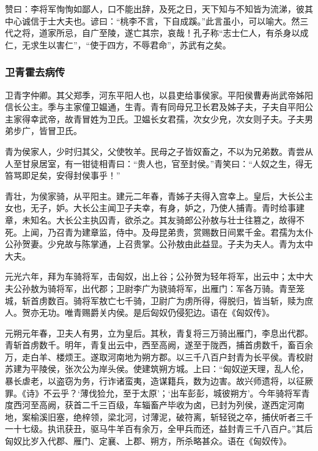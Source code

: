 \documentclass[]{article}
\begin{document}
赞曰：李将军恂恂如鄙人，口不能出辞，及死之日，天下知与不知皆为流涕，彼其中心诚信于士大夫也。谚曰：``桃李不言，下自成蹊。''此言虽小，可以喻大。然三代之将，道家所忌，自广至陵，遂亡其宗，哀哉！孔子称``志士仁人，有杀身以成仁，无求生以害仁''，``使于四方，不辱君命''，苏武有之矣。

\hypertarget{header-n4450}{%
\subsubsection{卫青霍去病传}\label{header-n4450}}

卫青字仲卿。其父郑季，河东平阳人也，以县吏给事侯家。平阳侯曹寿尚武帝姊阳信长公主。季与主家僮卫媪通，生青。青有同母兄卫长君及姊子夫，子夫自平阳公主家得幸武帝，故青冒姓为卫氏。卫媪长女君孺，次女少皃，次女则子夫。子夫男弟步广，皆冒卫氏。

青为侯家人，少时归其父，父使牧羊。民母之子皆奴畜之，不以为兄弟数。青尝从人至甘泉居室，有一钳徒相青曰：``贵人也，官至封侯。''青笑曰：``人奴之生，得无笞骂即足矣，安得封侯事乎！''

青壮，为侯家骑，从平阳主。建元二年春，青姊子夫得入宫幸上。皇后，大长公主女也，无子，妒。大长公主闻卫子夫幸，有身，妒之，乃使人捕青。青时给事建章，未知名。大长公主执囚青，欲杀之。其友骑郎公孙敖与壮士往篡之，故得不死。上闻，乃召青为建章监，侍中。及母昆弟贵，赏赐数日间累千金。君孺为太仆公孙贺妻。少皃故与陈掌通，上召贵掌。公孙敖由此益显。子夫为夫人。青为太中大夫。

元光六年，拜为车骑将军，击匈奴，出上谷；公孙贺为轻年将军，出云中；太中大夫公孙敖为骑将军，出代郡；卫尉李广为骁骑将军，出雁门：军各万骑。青至笼城，斩首虏数百。骑将军敖亡七千骑，卫尉广为虏所得，得脱归，皆当斩，赎为庶人。贺亦无功。唯青赐爵关内侯。是后匈奴仍侵犯边。语在《匈奴传》。

元朔元年春，卫夫人有男，立为皇后。其秋，青复将三万骑出雁门，李息出代郡。青斩首虏数千。明年，青复出云中，西至高阙，遂至于陇西，捕首虏数千，畜百余万，走白羊、楼烦王。遂取河南地为朔方郡。以三千八百户封青为长平侯。青校尉苏建为平陵侯，张次公为岸头侯。使建筑朔方城。上曰：``匈奴逆天理，乱人伦，暴长虐老，以盗窃为务，行诈诸蛮夷，造谋籍兵，数为边害。故兴师遗将，以征厥罪。《诗》不云乎？`薄伐猃允，至于太原'；`出车彭彭，城彼朔方'。今年骑将军青度西河至高阙，获首二千三百级，车辎畜产毕收为卤，已封为列侯，遂西定河南地，案榆溪旧塞，绝梓领，梁北河，讨薄泥，破符离，斩轻锐之卒，捕伏听者三千一十七级。执讯获丑，驱马牛羊百有余万，全甲兵而还，益封青三千八百户。''其后匈奴比岁入代郡、雁门、定襄、上郡、朔方，所杀略甚众。语在《匈奴传》。
\end{document}
